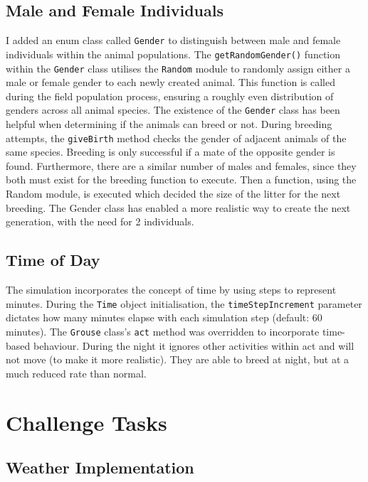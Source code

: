 \documentclass{article}
\begin{document}
\subsection{Male and Female Individuals}

I added an enum class called \texttt{Gender} to distinguish between male and female individuals within the animal populations. The \texttt{getRandomGender()} function within the \texttt{Gender} class utilises the \texttt{Random} module to randomly assign either a male or female gender to each newly created animal. This function is called during the field population process, ensuring a roughly even distribution of genders across all animal species. The existence of the \texttt{Gender} class has been helpful when determining if the animals can breed or not. During breeding attempts, the \texttt{giveBirth} method checks the gender of adjacent animals of the same species. Breeding is only successful if a mate of the opposite gender is found. Furthermore, there are a similar number of males and females, since they both must exist for the breeding function to execute. Then a function, using the Random module, is executed which decided the size of the litter for the next breeding. The Gender class has enabled a more realistic way to create the next generation, with the need for 2 individuals.

\subsection{Time of Day}

The simulation incorporates the concept of time by using steps to represent minutes. During the \texttt{Time} object initialisation, the \texttt{timeStepIncrement} parameter dictates how many minutes elapse with each simulation step (default: 60 minutes). The \texttt{Grouse} class's \texttt{act} method was overridden to incorporate time-based behaviour. During the night it ignores other activities within act and will not move (to make it more realistic). They are able to breed at night, but at a much reduced rate than normal.

\section{Challenge Tasks}

\subsection{Weather Implementation}
\end{document}
